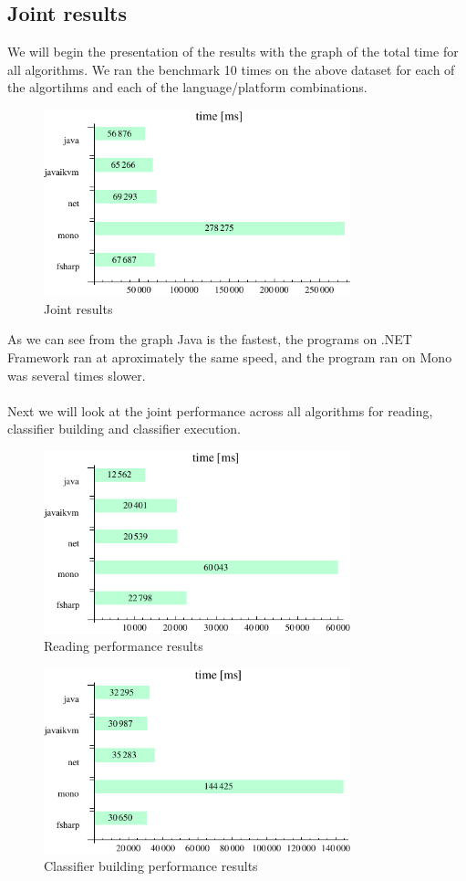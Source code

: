 \documentclass[journal]{IEEEtran/IEEEtran}
\newcommand\subsect[1]{\subsection{#1}\noindent}
\begin{document}
\subsect{Joint results}We will begin the presentation of the results with the graph of the total time for all algorithms. We ran the benchmark 10 times on the above dataset for each of the algortihms and each of the language/platform combinations.
\begin{figure}[H]
\centering
\includegraphics[width=3.5in]{total}
\caption{Joint results}
\end{figure}
As we can see from the graph Java is the fastest, the programs on .NET Framework ran at aproximately the same speed, and the program ran on Mono was several times slower.
\ \\ \ \\
Next we will look at the joint performance across all algorithms for reading, classifier building and classifier execution.
\begin{figure}[H]
\centering
\includegraphics[width=3.5in]{read}
\caption{Reading performance results}
\end{figure}

\begin{figure}[H]
\centering
\includegraphics[width=3.5in]{build}
\caption{Classifier building performance results}
\end{figure}
\end{document}
